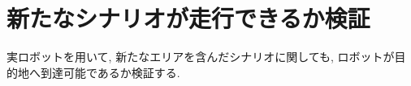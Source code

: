 \chapter{新たなシナリオが走行できるか検証}
\label{chap:experiment}
実ロボットを用いて, 新たなエリアを含んだシナリオに関しても, ロボットが目的地へ到達可能であるか検証する.


